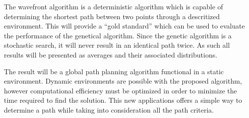 The wavefront algorithm is a deterministic algorithm which is capable of determining the shortest path between two points through a descritized environment. This will provide a ``gold standard'' which can be used to evaluate the performance of the genetical algorithm. Since the genetic algorithm is a stochastic search, it will never result in an identical path twice. As such all results will be presented as averages and their associated distributions.

The result will be a global path planning algorithm functional in a static environment. Dynamic environments are possible with the proposed algorithm, however computational efficiency must be optimized in order to minimize the time required to find the solution. This new applications offers a simple way to determine a path while taking into consideration all the path criteria.